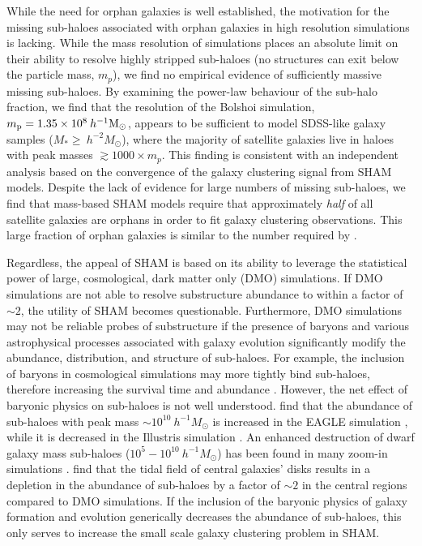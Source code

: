 \documentclass[a4paper,fleqn,usenatbib]{mnras}
\begin{document}
While the need for orphan galaxies is well established, the motivation for the missing sub-haloes associated with orphan galaxies in high resolution simulations is lacking.  While the mass resolution of simulations places an absolute limit on their ability to resolve highly stripped sub-haloes (no structures can exit below the particle mass, $m_p$), we find no empirical evidence of sufficiently massive missing sub-haloes.  By examining the power-law behaviour of the sub-halo fraction, we find that the resolution of the Bolshoi simulation, $m_{\rm p} = 1.35 \times 10^8 \>h^{-1}\rm M_\odot$, appears to be sufficient to model SDSS-like galaxy samples ($M_* \geq ~h^{-2}M_{\odot}$), where the majority of satellite galaxies live in haloes with peak masses $\gtrsim 1000 \times m_p$.  This finding is consistent with an independent analysis based on the convergence of the galaxy clustering signal \citep{Guo:2013fm} from SHAM models.  Despite the lack of evidence for large numbers of missing sub-haloes, we find that mass-based SHAM models require that approximately {\em half} of all satellite galaxies are orphans in order to fit galaxy clustering observations.  This large fraction of orphan galaxies is similar to the number required by \cite{Yang:2012ew}.      

Regardless, the appeal of SHAM is based on its ability to leverage the statistical power of large, cosmological, dark matter only (DMO) simulations.  If DMO simulations are not able to resolve substructure abundance to within a factor of $\sim 2$, the utility of SHAM becomes questionable.  Furthermore, DMO simulations may not be reliable probes of substructure if the presence of baryons and various astrophysical processes associated with galaxy evolution significantly modify the abundance, distribution, and structure of sub-haloes.  For example, the inclusion of baryons in cosmological simulations may more tightly bind sub-haloes, therefore increasing the survival time and abundance  \citep{Fiacconi:2016ba}.  However, the net effect of baryonic physics on sub-haloes is not well understood.  \citet{Despali:2016uv} find that the abundance of sub-haloes with peak mass $\sim 10^{10}~h^{-1}M_{\odot}$ is increased in the EAGLE simulation \citep{Schaye:2015gk}, while it is decreased in the Illustris simulation \citep{Vogelsberger:2014gw}.  An enhanced destruction of dwarf galaxy mass sub-haloes ($10^{5} -10^{10} ~h^{-1}M_{\odot}$) has been found in many zoom-in simulations \citep{Read:2006da, Read:2006hw, Brooks:2014jv, Wetzel:2016iy}.  \citet{GarrisonKimmel:2017tu} find that the tidal field of central galaxies' disks results in a depletion in the abundance of sub-haloes by a factor of $\sim 2$ in the central regions compared to DMO simulations.  If the inclusion of the baryonic physics of galaxy formation and evolution generically decreases the abundance of sub-haloes, this only serves to increase the small scale galaxy clustering problem in SHAM.  
\end{document}
